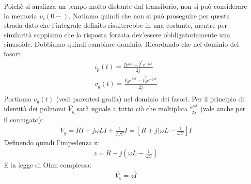 \documentclass{article}
\numberwithin{equation}{subsection}
\begin{document}
Poichè si analizza un tempo molto distante dal transitorio, non si può considerare la memoria $v_c(0-)$. Notiamo quindi che non si può proseguire per questa strada dato che l'integrale definito risulterebbe in una costante, mentre per similarità sappiamo che la risposta forzata dev'essere obbligatoriamente una sinusoide. Dobbiamo quindi cambiare dominio. Ricordando che nel dominio dei fasori:
\begin{gather*}
    i_p(t)=\displaystyle\frac{\overline{I}e^{j\omega t}-\overline{I}^*e^{-j\omega t}}{2j}\\
    v_{g}(t)=\displaystyle\frac{\overline{V}_ge^{j\omega t}-\overline{V}_g^*e^{-j\omega t}}{2j}\\
\end{gather*}
Portiamo $v_g(t)$ (vedi parentesi graffa) nel dominio dei fasori.
Per il principio di identità dei polinomi $\overline{V_g}$ sarà uguale a tutto ciò che moltiplica $\frac{e^{j\omega t}}{2j}$ (vale anche per il coniugato):
\begin{gather*}
    \overline{V_g} = R\overline{I} + j\omega L \overline{I} + \frac{1}{j\omega C}\overline{I}=[R + j(\omega L - \frac{1}{\omega C}]\overline{I}
\end{gather*}
Definendo quindi l'impedenza z:
\begin{gather*}
    z=R + j(\omega L - \frac{1}{\omega C})
\end{gather*}
E la legge di Ohm complessa:
\begin{gather*}
    \overline{V_g}=z\overline{I}
\end{gather*}
\newpage
\end{document}
